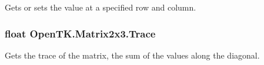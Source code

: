 Gets or sets the value at a specified row and column. 

\hypertarget{struct_open_t_k_1_1_matrix2x3_a08c6565b22e96005dd8304f919e2d3ff}{
\subsubsection[{Trace}]{\setlength{\rightskip}{0pt plus 5cm}float Open\-T\-K.\-Matrix2x3.\-Trace\hspace{0.3cm}{\ttfamily [get]}}}\label{struct_open_t_k_1_1_matrix2x3_a08c6565b22e96005dd8304f919e2d3ff}


Gets the trace of the matrix, the sum of the values along the diagonal. 

